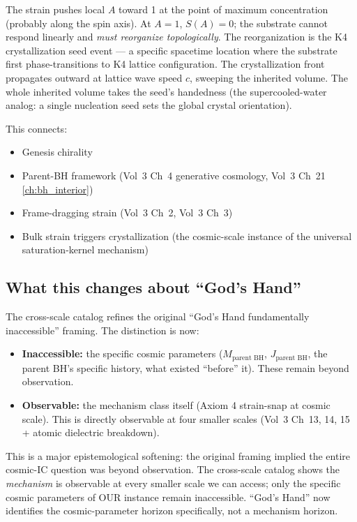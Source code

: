 The strain pushes local $A$ toward 1 at the point of maximum concentration
(probably along the spin axis). At $A = 1$, $S(A) = 0$; the substrate
cannot respond linearly and \emph{must reorganize topologically}. The
reorganization is the K4 crystallization seed event --- a specific
spacetime location where the substrate first phase-transitions to K4 lattice
configuration. The crystallization front propagates outward at lattice wave
speed $c$, sweeping the inherited volume. The whole inherited volume takes
the seed's handedness (the supercooled-water analog: a single nucleation
seed sets the global crystal orientation).

This connects:
\begin{itemize}
    \item Genesis chirality
    \item Parent-BH framework (Vol~3 Ch~4 generative cosmology, Vol~3 Ch~21 \ref{ch:bh_interior})
    \item Frame-dragging strain (Vol~3 Ch~2, Vol~3 Ch~3)
    \item Bulk strain triggers crystallization (the cosmic-scale instance of the universal saturation-kernel mechanism)
\end{itemize}

\subsection{What this changes about ``God's Hand''}

The cross-scale catalog refines the original ``God's Hand fundamentally
inaccessible'' framing. The distinction is now:

\begin{itemize}
    \item \textbf{Inaccessible:} the specific cosmic parameters
    ($M_{\text{parent BH}}$, $J_{\text{parent BH}}$, the parent BH's specific
    history, what existed ``before'' it). These remain beyond observation.
    \item \textbf{Observable:} the mechanism class itself (Axiom 4
    strain-snap at cosmic scale). This is directly observable at four
    smaller scales (Vol~3 Ch~13, 14, 15 + atomic dielectric breakdown).
\end{itemize}

This is a major epistemological softening: the original framing implied the
entire cosmic-IC question was beyond observation. The cross-scale catalog
shows the \emph{mechanism} is observable at every smaller scale we can access;
only the specific cosmic parameters of OUR instance remain inaccessible.
``God's Hand'' now identifies the cosmic-parameter horizon specifically, not
a mechanism horizon.

